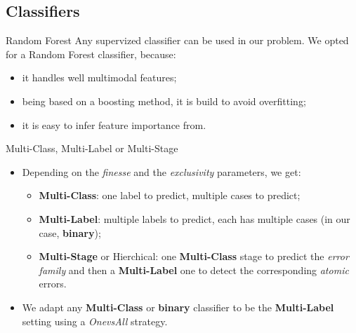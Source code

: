 \documentclass{beamer}
\begin{document}
        \subsection{Classifiers}
            \begin{frame}{Random Forest}
                Any supervized classifier can be used in our problem. We opted for a Random Forest classifier, because:
                \begin{itemize}[label=$\blacktriangleright$, font=\color{IGNGreen}]
                    \item<1-> it handles well multimodal features;
                    \item<2-> being based on a boosting method, it is build to avoid overfitting;
                    \item<3-> it is easy to infer feature importance from.
                \end{itemize}
            \end{frame}
            \begin{frame}{Multi-Class, Multi-Label or Multi-Stage}
                \begin{itemize}[label=$\blacktriangleright$, font=\color{IGNGreen}]
                    \item<1-> Depending on the \emph{finesse} and the \emph{exclusivity} parameters, we get:
                    \begin{itemize}[label=--]
                        \item<2-> \textbf{Multi-Class}: one label to predict, multiple cases to predict;
                        \item<3-> \textbf{Multi-Label}: multiple labels to predict, each has multiple cases (in our case, \textbf{binary});
                        \item<3-> \textbf{Multi-Stage} or Hierchical: one \textbf{Multi-Class} stage to predict the \emph{error family} and then a \textbf{Multi-Label} one to detect the corresponding \emph{atomic} errors.
                    \end{itemize}
                    \item<4-> We adapt any \textbf{Multi-Class} or \textbf{binary} classifier to be the \textbf{Multi-Label} setting using a \emph{OnevsAll} strategy.
                \end{itemize}
            \end{frame}
\end{document}
